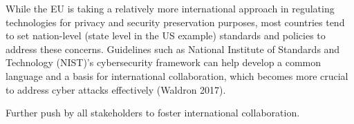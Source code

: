  While the EU is taking a relatively more international approach in regulating technologies for privacy and security preservation purposes, most countries tend to set nation-level (state level in the US example) standards and policies to address these concerns. Guidelines such as National Institute of Standards and Technology (NIST)’s cybersecurity framework can help develop a common language and a basis for international collaboration, which becomes more crucial to address cyber attacks effectively (Waldron 2017).

 Further push by all stakeholders to foster international collaboration.
